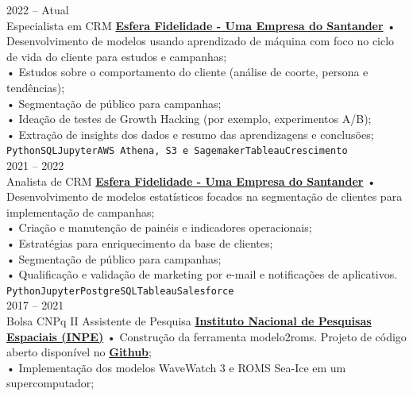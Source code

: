 \documentclass[9pt]{developercv} %
\begin{document}
\begin{entrylist}
	\entry
		{2022 -- Atual\\}
		{Especialista em CRM}
		{\href{https://www.esfera.com.vc}{\textcolor{bleu_cite}{\textbf{Esfera Fidelidade - Uma Empresa do Santander}}}}
		{• Desenvolvimento de modelos usando aprendizado de máquina com foco no ciclo de vida do cliente para estudos e campanhas;\\
		• Estudos sobre o comportamento do cliente (análise de coorte, persona e tendências);\\ 
		• Segmentação de público para campanhas;\\
		• Ideação de testes de Growth Hacking (por exemplo, experimentos A/B);\\
		• Extração de insights dos dados e resumo das aprendizagens e conclusões;\\
		\texttt{Python}\slashsep\texttt{SQL}\slashsep\texttt{Jupyter}\slashsep\texttt{AWS Athena, S3 e Sagemaker}\slashsep\texttt{Tableau}\slashsep\texttt{Crescimento}}
		\\\entry
		{2021 --  2022\\}
		{Analista de CRM}
		{\href{https://www.esfera.com.vc}{\textcolor{bleu_cite}{\textbf{Esfera Fidelidade - Uma Empresa do Santander}}}}
		{• Desenvolvimento de modelos estatísticos focados na segmentação de clientes para implementação de campanhas;\\
		• Criação e manutenção de painéis e indicadores operacionais;\\
		• Estratégias para enriquecimento da base de clientes;\\
		• Segmentação de público para campanhas;\\
		• Qualificação e validação de marketing por e-mail e notificações de aplicativos.\\
		\texttt{Python}\slashsep\texttt{Jupyter}\slashsep\texttt{PostgreSQL}\slashsep\texttt{Tableau}\slashsep\texttt{Salesforce}}
		\\\entry
		{2017 -- 2021\\\footnotesize{Bolsa CNPq II}}
		{Assistente de Pesquisa}
		{\href{https://www.gov.br/inpe/pt-br}{\textcolor{bleu_cite}{\textbf{Instituto Nacional de Pesquisas Espaciais (INPE)}}}}
		{• Construção da ferramenta modelo2roms. Projeto de código aberto disponível no \href{https://github.com/uesleisutil/model2roms}{\textcolor{bleu_cite}{\textbf{Github}}}; \\	
		• Implementação dos modelos WaveWatch 3 e ROMS Sea-Ice em um supercomputador;\\
}
\end{entrylist}
\end{document}
